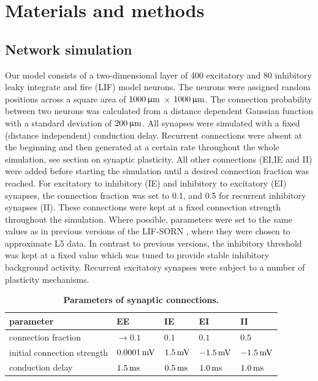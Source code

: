 \documentclass[10pt,letterpaper]{article}
\begin{document}
\section*{Materials and methods}
\subsection*{Network simulation} \label{network simulation}

Our model consists of a two-dimensional layer of 400 excitatory and 80 inhibitory  leaky integrate and fire (LIF) model neurons. The neurons were assigned random positions across a square area of $1000 \, \rm \upmu m$ $\times$  $1000 \, \rm \upmu m$. The connection probability between two neurons was calculated from a distance dependent Gaussian function with a standard deviation of $\rm 200\, \upmu m$. All synapses were simulated with a fixed (distance independent) conduction delay. Recurrent connections were absent at the beginning and then generated at a certain rate throughout the whole simulation, see section on synaptic plasticity. All other connections (EI,IE and II) were added before starting the simulation until a desired connection fraction was reached. For excitatory to inhibitory (IE) and inhibitory to excitatory (EI) synapses, the connection fraction was set to 0.1, and 0.5 for recurrent inhibitory synapses (II). These connections were kept at a fixed connection strength throughout the simulation. Where possible, parameters were set to the same values as in previous versions of the LIF-SORN \cite{SORN_Paper}, where they were chosen to approximate L5 data. In contrast to previous versions, the inhibitory threshold was kept at a fixed value which was tuned to provide stable inhibitory background activity. Recurrent excitatory synapses were subject to a number of plasticity mechanisms. 

\begin{table}
\caption{\bf Parameters of synaptic connections.}
\begin{tabular}{|l|l|l|l|l|}
\hline
\textbf{parameter} & \textbf{EE} & \textbf{IE} & \textbf{EI} & \textbf{II} \\ \hline
connection fraction & $\rightarrow 0.1$ & $0.1$ & $0.1$ & $0.5$ \\ \hline
initial connection strength & $\rm 0.0001\, mV$ & $\rm 1.5\, mV$ & $\rm -1.5\, mV$ & $\rm -1.5\, mV$ \\ \hline
conduction delay & $\rm 1.5\, ms$ & $\rm 0.5\, ms$ & $\rm 1.0\, ms$ & $\rm 1.0\, ms$ \\
\hline
\end{tabular}
\label{syn_conn_params}
\end{table}
\end{document}

